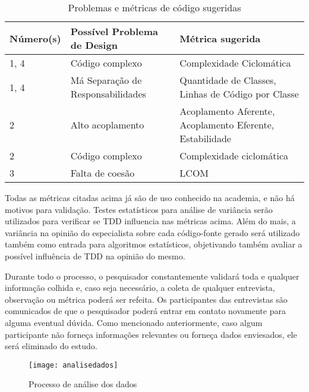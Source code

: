 \begin{table}[h!]
	\begin{tabular}{ | p{2cm} | p{7cm} | p{6cm} | }
		Número(s) & Possível Problema de Design & Métrica sugerida \\ \hline
		1, 4 & Código complexo & Complexidade Ciclomática \\
		1, 4 & Má Separação de Responsabilidades & Quantidade de Classes, Linhas de Código por Classe \\
		
		\hline
		
		2 & Alto acoplamento & Acoplamento Aferente, Acoplamento Eferente, Estabilidade \\
		2 & Código complexo & Complexidade ciclomática \\
		
		\hline
		
		3 & Falta de coesão & LCOM \\
		
		\hline
		
	\end{tabular}
	\caption{Problemas e métricas de código sugeridas}
\end{table}

Todas as métricas citadas acima já são de uso conhecido na academia, e não há 
motivos para validação. Testes estatísticos para análise de variância serão utilizados
para verificar se TDD influencia nas métricas acima.
Além do mais, a variância na opinião do especialista sobre cada código-fonte gerado
será utilizado também como entrada para algoritmos estatísticos, objetivando também
avaliar a possível influência de TDD na opinião do mesmo.

Durante todo o processo, o pesquisador constantemente validará toda e qualquer
informação colhida e, caso seja necessário, a coleta de qualquer entrevista,
observação ou métrica poderá ser refeita. Os participantes das entrevistas
são comunicados de que o pesquisador poderá entrar em contato
novamente para alguma eventual dúvida.
Como mencionado anteriormente, caso algum participante não forneça informações
relevantes ou forneça dados enviesados, ele será eliminado do estudo.

\begin{figure}
  \centering
  \texttt{[image: analisedados]}
  \caption{Processo de análise dos dados}
  \label{fig:analise-dados}
\end{figure}

